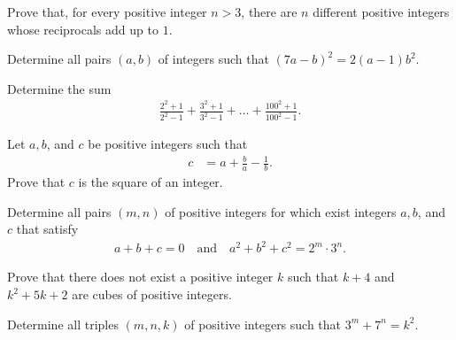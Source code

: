\documentclass[problems.tex]{subfile}
\begin{document}
	\begin{problem}
		Prove that, for every positive integer $n > 3$, there are $n$ different positive integers whose reciprocals add up to $1$.
	\end{problem}



	\begin{problem}
		Determine all pairs $(a, b)$ of integers such that $(7a - b)^2 = 2(a - 1)b^2$.
	\end{problem}




	\begin{problem}
		Determine the sum
		\begin{align*}
			\frac{2^2+1}{2^2-1} + \frac{3^2+1}{3^2-1} + \dots + \frac{100^2+1}{100^2-1}.
		\end{align*}
	\end{problem}



	\begin{problem}
		Let $a,b$, and $c$ be positive integers such that
		\begin{align*}
			c &= a + \frac{b}{a} - \frac{1}{b}.
		\end{align*}
		Prove that $c$ is the square of an integer.
	\end{problem}




	\begin{problem}
		Determine all pairs $(m, n)$ of positive integers for which exist integers $a, b$, and $c$ that satisfy
		\begin{align*}
			a+b+c=0 \quad \text{and} \quad a^2+b^2+c^2=2^m \cdot 3^n.
		\end{align*}
	\end{problem}




	\begin{problem}
		Prove that there does not exist a positive integer $k$ such that $k + 4$ and $k^2 + 5k + 2$ are cubes of positive integers.
	\end{problem}




	\begin{problem}
		Determine all triples $(m, n, k)$ of positive integers such that $3^m + 7^n = k^2$.
	\end{problem}
\end{document}
